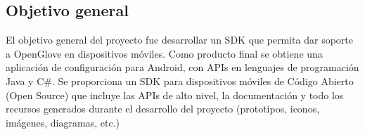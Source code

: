 \subsection{Objetivo general}
El objetivo general del proyecto fue desarrollar un SDK que permita dar soporte a OpenGlove en dispositivos móviles. Como producto final se obtiene una aplicación de configuración para Android, con APIs en lenguajes de programación Java y C\#. Se proporciona un SDK para dispositivos móviles de Código Abierto (Open Source) que incluye las APIs de alto nivel, la documentación y todo los recursos generados durante el desarrollo del proyecto (prototipos, iconos, imágenes, diagramas, etc.) 